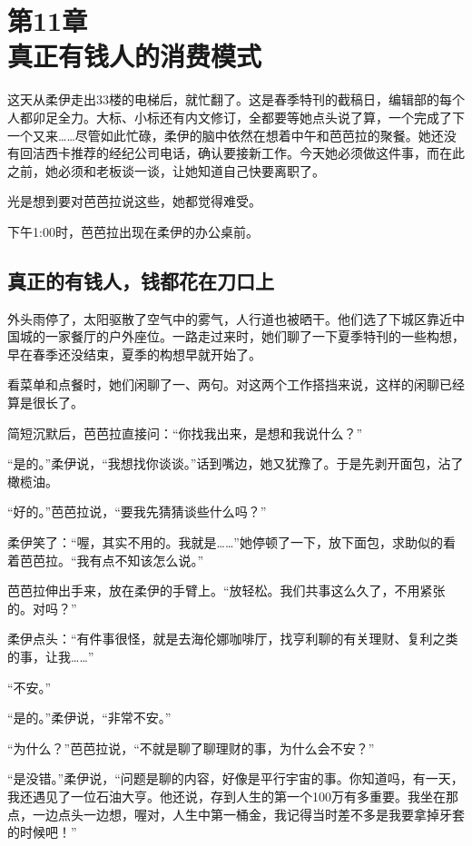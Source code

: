 \section[第11章\q 真正有钱人的消费模式]{第11章\\ 真正有钱人的消费模式}
\label{sec:ch11}

这天从柔伊走出33楼的电梯后，就忙翻了。这是春季特刊的截稿日，编辑部的每个人都卯足全力。大标、小标还有内文修订，全都要等她点头说了算，一个完成了下一个又来……尽管如此忙碌，柔伊的脑中依然在想着中午和芭芭拉的聚餐。她还没有回洁西卡推荐的经纪公司电话，确认要接新工作。今天她必须做这件事，而在此之前，她必须和老板谈一谈，让她知道自己快要离职了。

光是想到要对芭芭拉说这些，她都觉得难受。

下午1:00时，芭芭拉出现在柔伊的办公桌前。

\subsection{真正的有钱人，钱都花在刀口上}

外头雨停了，太阳驱散了空气中的雾气，人行道也被晒干。他们选了下城区靠近中国城的一家餐厅的户外座位。一路走过来时，她们聊了一下夏季特刊的一些构想，早在春季还没结束，夏季的构想早就开始了。

看菜单和点餐时，她们闲聊了一、两句。对这两个工作搭挡来说，这样的闲聊已经算是很长了。

简短沉默后，芭芭拉直接问：“你找我出来，是想和我说什么？”

“是的。”柔伊说，“我想找你谈谈。”话到嘴边，她又犹豫了。于是先剥开面包，沾了橄榄油。

“好的。”芭芭拉说，“要我先猜猜谈些什么吗？”

柔伊笑了：“喔，其实不用的。我就是……”她停顿了一下，放下面包，求助似的看着芭芭拉。“我有点不知该怎么说。”

芭芭拉伸出手来，放在柔伊的手臂上。“放轻松。我们共事这么久了，不用紧张的。对吗？”

柔伊点头：“有件事很怪，就是去海伦娜咖啡厅，找亨利聊的有关理财、复利之类的事，让我……”

“不安。”

“是的。”柔伊说，“非常不安。”

“为什么？”芭芭拉说，“不就是聊了聊理财的事，为什么会不安？”

“是没错。”柔伊说，“问题是聊的内容，好像是平行宇宙的事。你知道吗，有一天，我还遇见了一位石油大亨。他还说，存到人生的第一个100万有多重要。我坐在那点，一边点头一边想，喔对，人生中第一桶金，我记得当时差不多是我要拿掉牙套的时候吧！”


